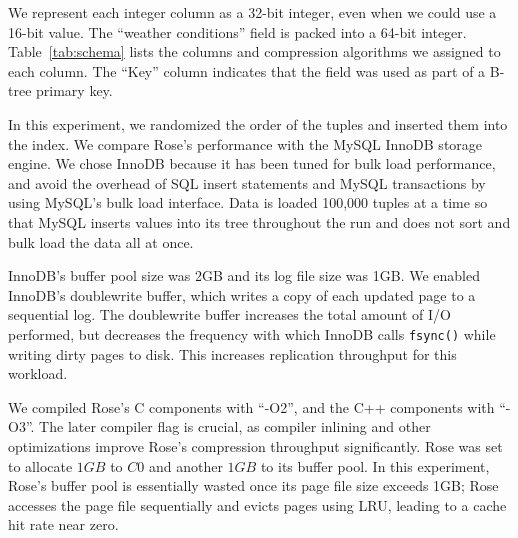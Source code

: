 \documentclass{vldb}
\newcommand{\rows}{Rose\xspace}
\newcommand{\rowss}{Rose's\xspace}
\begin{document}
We represent each integer column as a 32-bit integer, even when we could use a 16-bit value.
The ``weather conditions'' field is packed into a
64-bit integer.  Table~\ref{tab:schema} lists the columns and
compression algorithms we assigned to each column.  The ``Key'' column indicates
that the field was used as part of a B-tree primary key.

In this experiment, we randomized the order of the tuples and inserted
them into the index.  We compare \rowss performance with the MySQL
InnoDB storage engine.  We chose InnoDB because it has been tuned for
bulk load performance, and avoid the overhead of SQL insert
statements and MySQL transactions by using MySQL's bulk load
interface.  Data is loaded 100,000 tuples at a time so that
MySQL inserts values into its tree throughout the run and does not
sort and bulk load the data all at once.


InnoDB's buffer pool size was 2GB and its log file size was 1GB.
We enabled InnoDB's doublewrite buffer, which writes a copy of each updated
page to a sequential log.  The doublewrite buffer increases the total amount of
I/O performed, but decreases the frequency with
which InnoDB calls {\tt fsync()} while writing dirty pages to disk.  This
increases replication throughput for this workload.

We compiled \rowss C components with ``-O2'', and the C++ components
with ``-O3''.  The later compiler flag is crucial, as compiler
inlining and other optimizations improve \rowss compression throughput
significantly.  \rows was set to allocate $1GB$ to $C0$ and another
$1GB$ to its buffer pool.  In this experiment, \rowss buffer pool is
essentially wasted once its page file size exceeds 1GB; \rows
accesses the page file sequentially and evicts pages using LRU,
leading to a cache hit rate near zero.
\end{document}
